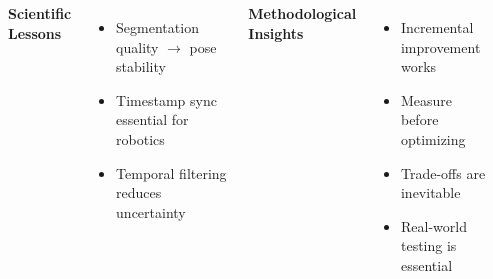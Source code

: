 \documentclass[serif, aspectratio=169, 9pt]{beamer}
\begin{document}
\begin{frame}
\begin{columns}
\begin{itemize}
        \end{itemize}
        \vspace{0.3em}
        \textbf{Scientific Lessons}
        \begin{itemize}
            \item Segmentation quality $\to$ pose stability
            \item Timestamp sync essential for robotics
            \item Temporal filtering reduces uncertainty
        \end{itemize}
        \textbf{Methodological Insights}
        \begin{itemize}
            \item Incremental improvement works
            \item Measure before optimizing
            \item Trade-offs are inevitable
            \item Real-world testing is essential

\end{itemize}
\end{columns}
\end{frame}
\end{document}
